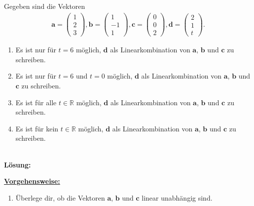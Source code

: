 \subsection*{}
Gegeben sind die Vektoren
\begin{align*}
\textbf{a}
= 
\begin{pmatrix}
1 \\ 2 \\ 3
\end{pmatrix},
\textbf{b}
=
\begin{pmatrix}
1 \\ -1 \\ 1
\end{pmatrix},
\textbf{c}
=
\begin{pmatrix}
0 \\ 0 \\ 2
\end{pmatrix},
\textbf{d}
=
\begin{pmatrix}
2 \\ 1 \\ t
\end{pmatrix}.
\end{align*}
\renewcommand{\labelenumi}{(\alph{enumi})}
\begin{enumerate}
	\item 
	Es ist nur für $ t = 6 $ möglich, $ \textbf{d} $ als Linearkombination von $ \textbf{a} $, $ \textbf{b} $ und $ \textbf{c} $ zu schreiben.
	\item
	Es ist nur für $ t = 6 $ und $ t = 0 $ möglich, $ \textbf{d} $ als Linearkombination von $ \textbf{a} $, $ \textbf{b} $ und $ \textbf{c} $ zu schreiben.
	\item
	Es ist für alle $ t\in \mathbb{R} $ möglich, $ \textbf{d} $ als Linearkombination von $ \textbf{a} $, $ \textbf{b} $ und $ \textbf{c} $ zu schreiben.
	\item
	Es ist für kein $ t\in \mathbb{R} $ möglich, $ \textbf{d} $ als Linearkombination von $ \textbf{a} $, $ \textbf{b} $ und $ \textbf{c} $ zu schreiben.
\end{enumerate}
\ \\
\textbf{Lösung:}
\begin{mdframed}
\underline{\textbf{Vorgehensweise:}}
\renewcommand{\labelenumi}{\theenumi.}
\begin{enumerate}
\item Überlege dir, ob die Vektoren $ \textbf{a} $, $ \textbf{b} $ und $ \textbf{c} $ linear unabhängig sind.
\end{enumerate}
\end{mdframed}

